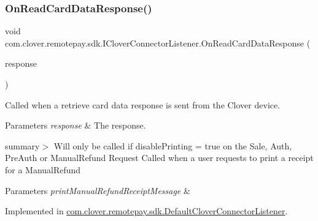 \mbox{\label{interfacecom_1_1clover_1_1remotepay_1_1sdk_1_1_i_clover_connector_listener_af4bbb0ceeab318ef482f0e90506d36b0}} 
\subsubsection{\texorpdfstring{On\+Read\+Card\+Data\+Response()}{OnReadCardDataResponse()}}
{\footnotesize\ttfamily void com.\+clover.\+remotepay.\+sdk.\+I\+Clover\+Connector\+Listener.\+On\+Read\+Card\+Data\+Response (\begin{DoxyParamCaption}\item[{\hyperlink{classcom_1_1clover_1_1remotepay_1_1sdk_1_1_read_card_data_response}{Read\+Card\+Data\+Response}}]{response }\end{DoxyParamCaption})}



Called when a retrieve card data response is sent from the Clover device. 


\begin{DoxyParams}{Parameters}
{\em response} & The response.\\
\hline
\end{DoxyParams}
summary$>$ Will only be called if disable\+Printing = true on the Sale, Auth, Pre\+Auth or Manual\+Refund Request Called when a user requests to print a receipt for a Manual\+Refund 


\begin{DoxyParams}{Parameters}
{\em print\+Manual\+Refund\+Receipt\+Message} & \\
\hline
\end{DoxyParams}


Implemented in \hyperlink{classcom_1_1clover_1_1remotepay_1_1sdk_1_1_default_clover_connector_listener_abf40aa043a50f59be9e36c3911ac895d}{com.\+clover.\+remotepay.\+sdk.\+Default\+Clover\+Connector\+Listener}.

\mbox{\label{interfacecom_1_1clover_1_1remotepay_1_1sdk_1_1_i_clover_connector_listener_a587ba1b1dfd1201e9225c7bc6323ad45}} 
